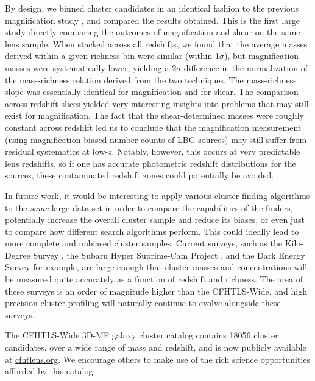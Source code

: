 By design, we binned cluster candidates in an identical fashion to the previous magnification study \citep{Ford14}, and compared the results obtained. This is the first large study directly comparing the outcomes of magnification and shear on the same lens sample. When stacked across all redshifts, we found that the average masses derived within a given richness bin were similar (within 1$\sigma$), but magnification masses were systematically lower, yielding a 2$\sigma$ difference in the normalization of the mass-richness relation derived from the two techniques. The mass-richness slope was essentially identical for magnification and for shear. The comparison across redshift slices yielded very interesting insights into problems that may still exist for magnification. The fact that the shear-determined masses were roughly constant across redshift led us to conclude that the magnification measurement (using magnification-biased number counts of \ac{LBG} sources) may still suffer from residual systematics at low-$z$. Notably, however, this occurs at very predictable lens redshifts, so if one has accurate photometric redshift distributions for the sources, these contaminated redshift zones could potentially be avoided.

In future work, it would be interesting to apply various cluster finding algorithms to the {\em same} large data set in order to compare the capabilities of the finders, potentially increase the overall cluster sample and reduce its biases, or even just to compare how different search algorithms perform.  This could ideally lead to more complete and unbiased cluster samples. Current surveys, such as the Kilo-Degree Survey \citep{KiDS13}, the Subaru Hyper Suprime-Cam Project \citep{HSC10}, and the Dark Energy Survey \citep{DES05} for example, are large enough that cluster masses and concentrations will be measured quite accurately as a function of redshift and richness. The area of these surveys is an order of magnitude higher than the \ac{CFHTLS}-Wide, and high precision cluster profiling will naturally continue to evolve alongside these surveys.

The \ac{CFHTLS}-Wide \ac{3D-MF} galaxy cluster catalog contains 18056 cluster candidates, over a wide range of mass and redshift, and is now publicly available at \url{cfhtlens.org}. We encourage others to make use of the rich science opportunities afforded by this catalog. 










